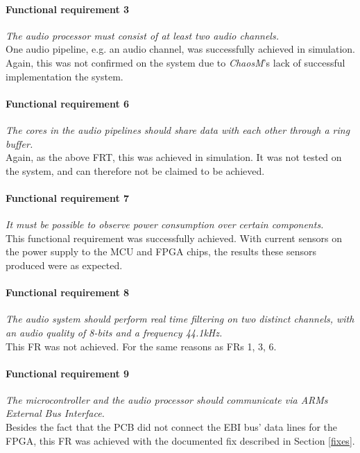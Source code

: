 \paragraph{Functional requirement 3}
\textit{The audio processor must consist of at least two audio channels.}\\
One audio pipeline, e.g. an audio channel, was successfully achieved in simulation. Again, this was not confirmed on the system due to \textit{ChaosM}'s lack of successful implementation the system.

\paragraph{Functional requirement 6}
\textit{The cores in the audio pipelines should share data with each other through a ring buffer.}\\
Again, as the above FRT, this was achieved in simulation. It was not tested on the system, and can therefore not be claimed to be achieved.

\paragraph{Functional requirement 7}
\textit{It must be possible to observe power consumption over certain components.}\\
This functional requirement was successfully achieved. With current sensors on the power supply to the MCU and FPGA chips, the results these sensors produced were as expected.

\paragraph{Functional requirement 8}
\textit{The audio system should perform real time filtering on two distinct
channels, with an audio quality of 8-bits and a frequency 44.1kHz.}\\
This FR was not achieved. For the same reasons as FRs 1, 3, 6.

\paragraph{Functional requirement 9}
\textit{The microcontroller and the audio processor should communicate via ARMs
External Bus Interface.}\\
Besides the fact that the PCB did not connect the EBI bus' data lines for the FPGA, this FR was achieved with the documented fix described in Section \ref{fixes}.

